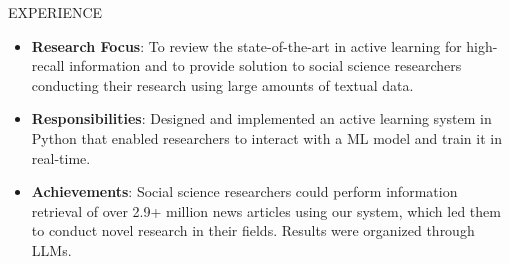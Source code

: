 \documentclass{resume} %
\begin{document}
\begin{rSection}{EXPERIENCE}
\vspace{-0.7cm}
\begin{itemize}
    \item \textbf{Research Focus}: To review the state-of-the-art in active learning for high-recall information and to provide solution to social science researchers conducting their research using large amounts of textual data.
    \vspace{-0.25cm}
    \item \textbf{Responsibilities}: Designed and implemented an active learning system in Python that enabled researchers to interact with a ML model and train it in real-time. 
    \vspace{-0.25cm}
    \item \textbf{Achievements}: Social science researchers could perform information retrieval of over 2.9+ million news articles using our system, which led them to conduct novel research in their fields. Results were organized through LLMs.
\end{itemize}

    



\end{rSection}
\end{document}
